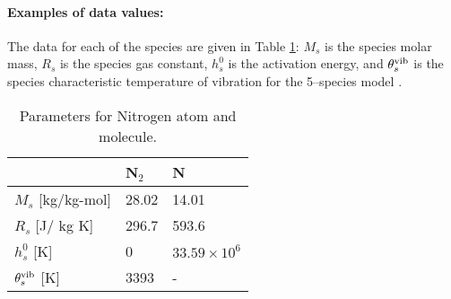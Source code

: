 \paragraph{Examples of data values:}
The data for each of the species are given in Table \ref{table01}: $M_s$ is the species molar mass,   $R_s$ is the species gas constant, $h^0_s$ is the activation energy, and $\theta^{\text{vib}}_{s}$ is the species characteristic temperature of vibration for the 5--species model \citep{Kessler2004}.
\begin{table}[htb]
\caption{Parameters for Nitrogen atom and molecule.}
\centering
\begin{tabular}{l l l}
\hline\hline
 &     N$_2$     &  N  \\ [0.25ex]
\hline 
$M_s$ [kg/kg-mol]  & 28.02     &14.01               \vspace{2pt} \\
$R_s$ [J/ kg K]    & 296.7    &593.6               \vspace{2pt}\\
$h^0_s$ [K]        & 0        &$33.59\times 10^6$  \vspace{2pt}\\
$\theta^{\text{vib}}_{s}$ [K] & 3393     &-                    \vspace{2pt}\\
\hline
\end{tabular}
\label{table01}
\end{table}


